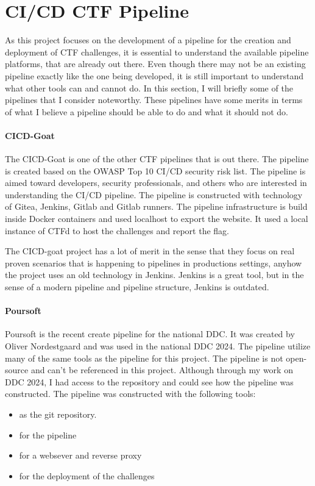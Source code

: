 \section{CI/CD CTF Pipeline}
\label{sec:ci-cd-ctf-pipeline}
As this project focuses on the development of a pipeline for the creation and deployment of \ac{CTF} challenges, 
it is essential to understand the available pipeline platforms, that are already out there. 
Even though there may not be an existing pipeline exactly 
like the one being developed, it is still important to understand what other tools can and cannot do. 
In this section, I will briefly some of the pipelines that I consider noteworthy. 
These pipelines have some merits in terms of what I believe a pipeline should be able to do and what it should not do.


\paragraph{CICD-Goat}
\label{par:cicd-goat}
The CICD-Goat\cite{cicd-goat} is one of the other \ac{CTF} pipelines that is out there.
The pipeline is created based on the OWASP Top 10 CI/CD security risk\cite{owasp-cicd-top-10} list.
The pipeline is aimed toward developers, security professionals, and others who are interested in understanding the \ac{CI/CD} pipeline.
The pipeline is constructed with technology of Gitea, Jenkins, Gitlab and Gitlab runners.
The pipeline infrastructure is build inside Docker containers and used localhost to export the website.
It used a local instance of CTFd to host the challenges and report the flag.

The CICD-goat project has a lot of merit in the sense that they focus on real proven scenarios that 
is happening to pipelines in productions settings, anyhow the project uses an old technology in Jenkins. Jenkins 
is a great tool, but in the sense of a modern pipeline and pipeline structure, Jenkins is outdated.

\paragraph{Poursoft}
\label{par:poursoft}
Poursoft is the recent create pipeline for the national \ac{DDC}. It was created by Oliver Nordestgaard
and was used in the national \ac{DDC} 2024. The pipeline utilize many of the same tools as the pipeline for this project.
The pipeline is not open-source and can't be referenced in this project. Although through my work on \ac{DDC} 2024,
I had access to the repository and could see how the pipeline was constructed. The pipeline was constructed with the following tools:
\begin{itemize}
    \item {} as the git repository.
    \item {} for the pipeline
    \item {} for a websever and reverse proxy
    \item {} for the deployment of the challenges
\end{itemize}

